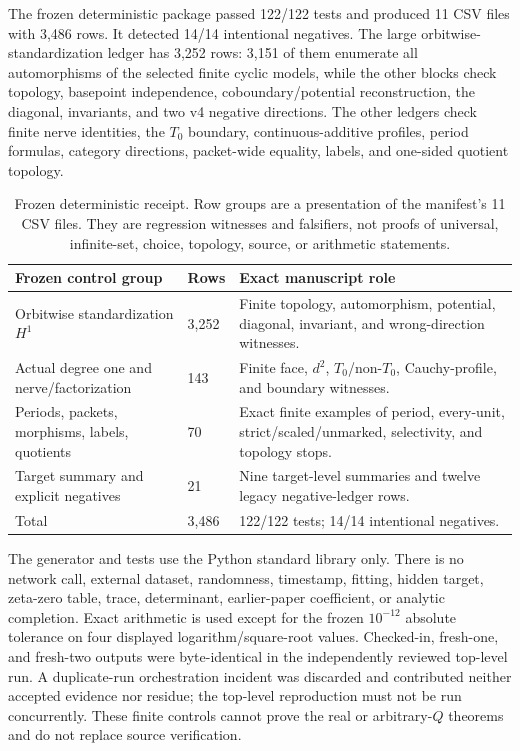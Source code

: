\documentclass[11pt]{article}
\theoremstyle{definition}
\begin{document}
The frozen deterministic package passed 122/122 tests and produced 11 CSV
files with 3,486 rows.  It detected 14/14 intentional negatives.  The large
orbitwise-standardization ledger has 3,252 rows: 3,151 of them enumerate all
automorphisms of the selected finite cyclic models, while the other blocks
check topology, basepoint independence, coboundary/potential reconstruction,
the diagonal, invariants, and two v4 negative directions.  The other ledgers
check finite nerve identities, the $T_0$ boundary, continuous-additive
profiles, period formulas, category directions, packet-wide equality,
labels, and one-sided quotient topology.

\begin{table}[ht]
\centering
\small
\begin{tabularx}{\textwidth}{P{38mm}P{19mm}Y}
\toprule
Frozen control group & Rows & Exact manuscript role \\
\midrule
Orbitwise standardization $H^1$ & 3,252 & Finite topology,
automorphism, potential, diagonal, invariant, and wrong-direction witnesses. \\
Actual degree one and nerve/factorization & 143 & Finite face, $d^2$,
$T_0$/non-$T_0$, Cauchy-profile, and boundary witnesses. \\
Periods, packets, morphisms, labels, quotients & 70 & Exact finite examples
of period, every-unit, strict/scaled/unmarked, selectivity, and topology stops. \\
Target summary and explicit negatives & 21 & Nine target-level summaries
and twelve legacy negative-ledger rows. \\
\midrule
Total & 3,486 & 122/122 tests; 14/14 intentional negatives. \\
\bottomrule
\end{tabularx}
\caption{Frozen deterministic receipt.  Row groups are a presentation of
the manifest's 11 CSV files.  They are regression witnesses and falsifiers,
not proofs of universal, infinite-set, choice, topology, source, or
arithmetic statements.}
\label{tab:controls}
\end{table}

The generator and tests use the Python standard library only.  There is no
network call, external dataset, randomness, timestamp, fitting, hidden
target, zeta-zero table, trace, determinant, earlier-paper coefficient, or
analytic completion.  Exact arithmetic is used except for the frozen
$10^{-12}$ absolute tolerance on four displayed logarithm/square-root
values.  Checked-in, fresh-one, and fresh-two outputs were byte-identical in
the independently reviewed top-level run.  A duplicate-run orchestration
incident was discarded and contributed neither accepted evidence nor
residue; the top-level reproduction must not be run concurrently.  These
finite controls cannot prove the real or arbitrary-$Q$ theorems and do not
replace source verification.
\end{document}
